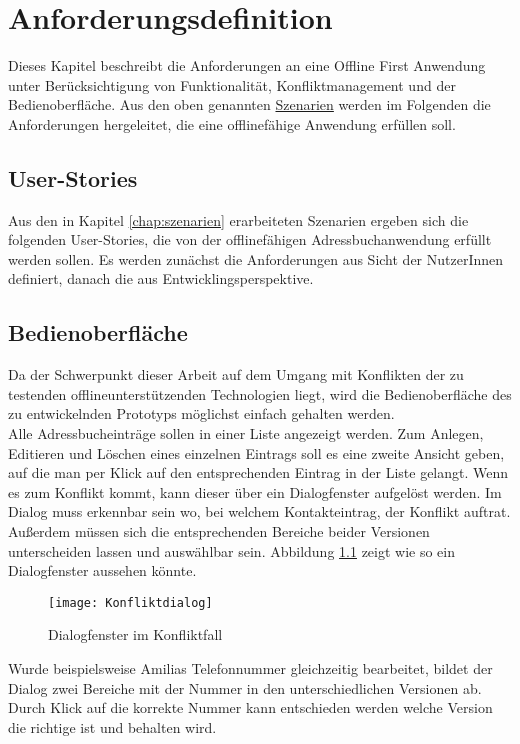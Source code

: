 \chapter{\label{chap:anforderungen}Anforderungsdefinition}
Dieses Kapitel beschreibt die Anforderungen an eine Offline First Anwendung unter Berücksichtigung von Funktionalität, Konfliktmanagement und der Bedienoberfläche.
Aus den oben genannten \hyperref[chap:szenarien]{Szenarien} werden im Folgenden die Anforderungen hergeleitet, die eine offlinefähige Anwendung erfüllen soll.
%
%
\section{User-Stories}
Aus den in Kapitel \ref{chap:szenarien} erarbeiteten Szenarien ergeben sich die folgenden User-Stories, die von der offlinefähigen Adressbuchanwendung erfüllt werden sollen.
Es werden zunächst die Anforderungen aus Sicht der NutzerInnen definiert, danach die aus Entwicklingsperspektive.


%
%

%
%
\section{Bedienoberfläche}
Da der Schwerpunkt dieser Arbeit auf dem Umgang mit Konflikten der zu testenden offlineunterstützenden Technologien liegt, wird die Bedienoberfläche des zu entwickelnden Prototyps  möglichst einfach gehalten werden.\\
Alle Adressbucheinträge sollen in einer Liste angezeigt werden. Zum Anlegen, Editieren und Löschen eines einzelnen Eintrags soll es eine zweite Ansicht geben, auf die man per Klick auf den entsprechenden Eintrag in der Liste gelangt.
Wenn es zum Konflikt kommt, kann dieser über ein Dialogfenster aufgelöst werden. Im Dialog muss erkennbar sein wo, bei welchem Kontakteintrag, der Konflikt auftrat. Außerdem müssen sich die entsprechenden Bereiche beider Versionen unterscheiden lassen und auswählbar sein. Abbildung \ref{fig:dialog} zeigt wie so ein Dialogfenster aussehen könnte.
\begin{figure}[H]
    \centering
    \texttt{[image: Konfliktdialog]}
    \grayRule
    \caption{Dialogfenster im Konfliktfall}
    \label{fig:dialog}
\end{figure}
Wurde beispielsweise Amilias Telefonnummer gleichzeitig bearbeitet, bildet der Dialog zwei Bereiche mit der Nummer in den unterschiedlichen Versionen ab. Durch Klick auf die korrekte Nummer kann entschieden werden welche Version die richtige ist und behalten wird.